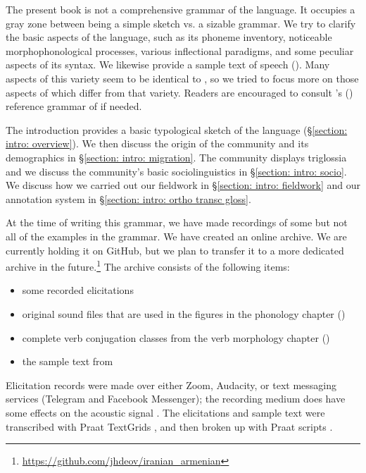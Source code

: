 The present book is not a comprehensive grammar of the language. It occupies a gray zone between being a simple sketch vs. a sizable   grammar. We try to clarify the basic aspects of the language, such as its phoneme inventory, noticeable morphophonological processes, various inflectional paradigms, and some peculiar aspects of its syntax.  We likewise provide a sample text of {\iaIA} speech ().  Many aspects of this variety seem  to be identical to {\seaSEA}, so we tried to focus more on those aspects of {\iaIA} which differ from that variety.  Readers are encouraged to consult \citeauthor{DumTragut-2009-ArmenianReferenceGrammar}'s (\citeyear{DumTragut-2009-ArmenianReferenceGrammar}) reference grammar of {\seaSEA} if needed. 

The introduction provides a basic typological sketch of the language (\S\ref{section: intro: overview}). We then discuss the origin of the {\iaIA} community and its demographics in \S\ref{section: intro: migration}. The community displays triglossia and we discuss the community's basic sociolinguistics in \S\ref{section: intro: socio}. We discuss how we carried out our fieldwork in \S\ref{section: intro: fieldwork} and our annotation system in \S\ref{section: intro: ortho transc gloss}. 

At the time of writing this grammar, we have made recordings of some but not all of the examples in the grammar. We have created an online archive.  We are currently holding it on GitHub, but we plan to transfer it to a more dedicated archive in the future.\footnote{\url{https://github.com/jhdeov/iranian_armenian}}  The archive consists of the following items:

\begin{itemize}\raggedright
	\item some recorded elicitations
	\item original sound files that are used in the figures in the  phonology chapter ()
	\item complete verb conjugation classes from the verb morphology chapter ()
	\item the sample text from 
\end{itemize} 

Elicitation records were made over either Zoom, Audacity, or text messaging services (Telegram and Facebook Messenger); the recording medium does have some effects on the acoustic signal \citep{SankerWeber-2021-DontDoThiSHomeEffectRecordingDevicesAcousticAnalyssis}. The elicitations and  sample text were transcribed with Praat TextGrids \citep{boersma-2001-praat}, and then broken up with Praat scripts \citep{DiCanio-ScriptFileDivison}.  






